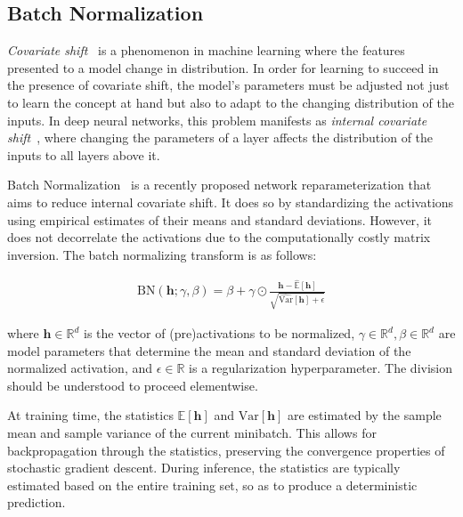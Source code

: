 \documentclass{article} %
\newcommand{\vect}[1]{\mathbf{#1}}
\newcommand{\ewprod}{\odot}
\newcommand{\reals}{\mathbb{R}}
\begin{document}
\subsection{Batch Normalization}

\emph{Covariate shift}~\citep{shimodaira2000improving} is a phenomenon in machine learning where
the features presented to a model change in distribution.
In order for learning to succeed in the presence of covariate shift,
the model's parameters must be adjusted not just to learn the concept at hand
but also to adapt to the changing distribution of the inputs.
In deep neural networks, this problem manifests as \emph{internal covariate shift}~\citep{batchnorm},
where changing the parameters of a layer affects the distribution of the inputs to all layers above it.

Batch Normalization~\citep{batchnorm} is a recently proposed network reparameterization that aims to reduce internal covariate shift.
It does so by standardizing the activations using empirical estimates of their means and standard deviations.
However, it does not decorrelate the activations due to the computationally costly matrix inversion.
The batch normalizing transform is as follows:

\begin{align}
\mathrm{BN}(\vect{h}; \gamma, \beta) =
  \beta + \gamma \ewprod
  \frac{\vect{h} -   \widehat{\mathbb{E  }}[\vect{h}]}
       {       \sqrt{\widehat{\mathrm{Var}}[\vect{h}] + \epsilon}}
\end{align}

where $\vect{h} \in \reals^d$ is the vector of (pre)activations to be normalized, 
$\gamma \in \reals^d, \beta \in \reals^d$ are model parameters that determine the 
mean and standard deviation of the normalized activation, and $\epsilon \in \reals$ 
is a regularization hyperparameter. The division should be understood to proceed elementwise.

At training time, the statistics $\mathbb{E}[\vect{h}]$ and $\mathrm{Var}[\vect{h}]$ are estimated
by the sample mean and sample variance of the current minibatch.
This allows for backpropagation through the statistics, preserving the convergence properties of stochastic gradient descent.
During inference, the statistics are typically estimated based on the entire training set, so as to produce a deterministic prediction.
\end{document}
